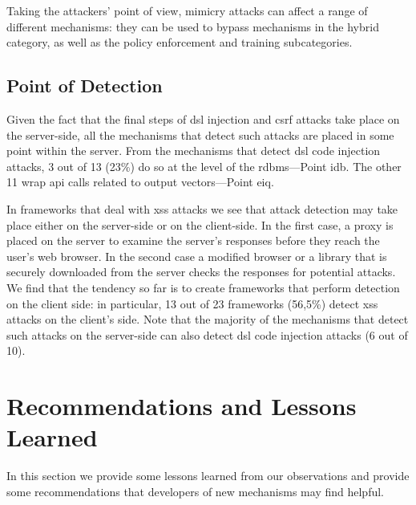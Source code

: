 \documentclass[conference]{IEEEtran}
\begin{document}
Taking the attackers' point of view, mimicry attacks can affect a
range of different mechanisms: they can be used to bypass mechanisms
in the hybrid category, as well as the policy enforcement and training
subcategories.

\subsection{Point of Detection}

Given the fact that the final steps of
{\sc dsl} injection and {\sc csrf} attacks take place
on the server-side, all the mechanisms that detect
such attacks are placed in some point within the server.
From the mechanisms that detect {\sc dsl} code injection
attacks, 3 out of 13 (23\%) do so at the level
of the {\sc rdbms}---Point i{\sc db}.
The other 11 wrap {\sc api} calls related to output
vectors---Point {\sc e}i{\sc q}.

In frameworks that deal with {\sc xss} attacks we
see that attack detection may take place either on the server-side or
on the client-side. In the first case, a proxy is placed on the server
to examine the server's responses before they reach the user's web
browser. In the second case a modified browser or a library that is
securely downloaded from the server checks the responses for potential
attacks. We find that the tendency so far is to create frameworks that
perform detection on the client side: in particular, 13 out of 23
frameworks (56,5\%) detect {\sc xss} attacks on the
client's side. Note that the majority of the mechanisms that detect
such attacks on the server-side can also detect {\sc dsl} code
injection attacks (6 out of 10).

\section{Recommendations and Lessons Learned}
\label{sec:lessons-learned}

In this section we provide some lessons learned from
our observations and provide some recommendations
that developers of new mechanisms may find helpful.

\end{document}
